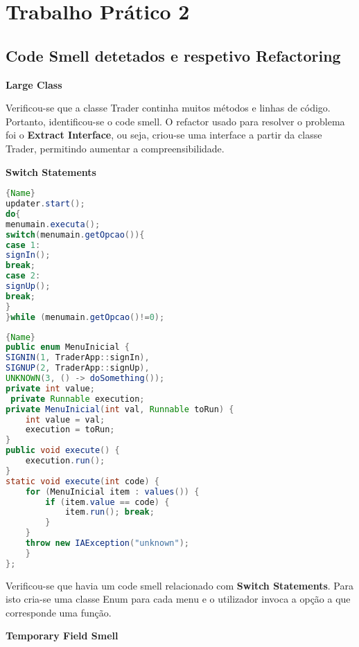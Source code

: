 \section{Trabalho Prático 2}\label{sec:Tp2}
\subsection{Code Smell detetados e respetivo Refactoring}

\vspace{5mm}
\textbf{Large Class}

Verificou-se que a classe Trader continha muitos métodos e linhas de código. Portanto, identificou-se o code smell. O refactor usado para resolver o problema foi o \textbf{Extract Interface}, ou seja, criou-se uma interface a partir da classe Trader, permitindo aumentar a compreensibilidade.

\textbf{Switch Statements}

\noindent\begin{minipage}{.45\textwidth}
\begin{lstlisting}[breaklines,caption=Original,frame=tlrb,language=java]{Name}
updater.start();
do{
menumain.executa();
switch(menumain.getOpcao()){
case 1:
signIn();
break;
case 2:
signUp();
break;
}
}while (menumain.getOpcao()!=0);
\end{lstlisting}
\end{minipage}\hfill
\begin{minipage}{.45\textwidth}
\begin{lstlisting}[breaklines,caption=Refactored,frame=tlrb,language=java]{Name}
public enum MenuInicial {
SIGNIN(1, TraderApp::signIn),
SIGNUP(2, TraderApp::signUp),
UNKNOWN(3, () -> doSomething());
private int value;
 private Runnable execution;
private MenuInicial(int val, Runnable toRun) {
    int value = val;
    execution = toRun;
}
public void execute() { 
    execution.run();
}
static void execute(int code) {
    for (MenuInicial item : values()) {
        if (item.value == code) {
            item.run(); break;
        }
    }
    throw new IAException("unknown");
    }
};
\end{lstlisting}
\end{minipage}

Verificou-se que havia um code smell relacionado com \textbf{Switch Statements}. Para isto cria-se uma classe Enum para cada menu e o utilizador invoca a opção a que corresponde uma função.

\textbf{Temporary Field Smell}

